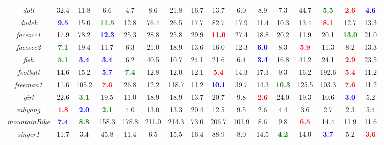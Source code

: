 \documentclass[preprint,12pt,review]{elsarticle}
\begin{document}
\begin{table*}[htp]
{\begin{tabular}{|c|c|c|c|c|c|c|c|c|c|c|c|c|c|c|c|}
\emph{doll}   &32.4   &11.8  &6.6 &4.7  &8.6 &21.8  &16.7  &13.7  &6.0  &8.9 &7.3 &44.7 &\textcolor{green}{\textbf{5.5}}  &\textcolor{red}{\textbf{2.6}}  &\textcolor{blue}{\textbf{4.6}}\\
\emph{dudek}   &\textcolor{blue}{\textbf{9.5}}  &15.0  &\textcolor{green}{\textbf{11.5}}  &12.8  &76.4 &26.5 &17.7 &82.7 &17.9 &11.4 &10.3 &13.4  &\textcolor{red}{\textbf{8.1}}  &12.7  &13.3 \\
\emph{faceocc1}   &17.9  &78.2  &\textcolor{blue}{\textbf{12.3}} &25.3  &28.8  &25.8  &29.9  &\textcolor{red}{\textbf{11.0}} &27.4 &18.8  &20.2  &11.9  &20.1 &\textcolor{green}{\textbf{13.0}} &21.0\\
\emph{faceocc2}  &\textcolor{green}{\textbf{7.1}}  &19.4  &11.7 &6.3  &21.0   &18.9  &13.6  &16.0  &12.3  &\textcolor{blue}{\textbf{6.0}} &8.3 &\textcolor{red}{\textbf{5.9}}  &11.3  &8.2 &13.3\\
\emph{fish}   &\textcolor{green}{\textbf{5.1}}  &\textcolor{blue}{\textbf{3.4}}  &\textcolor{blue}{\textbf{3.4}}   &6.2  &40.5 &10.7  &24.1  &21.6  &6.4  &\textcolor{blue}{\textbf{3.4}}  &16.8 &41.2 &24.1 &\textcolor{red}{\textbf{2.9}}  &23.5\\
\emph{football}   &14.6  &15.2  &\textcolor{blue}{\textbf{5.7}} &\textcolor{green}{\textbf{7.4}}  &12.8  &12.0  &12.1  &\textcolor{red}{\textbf{5.4}}  &14.3  &17.3  &9.3  &16.2  &192.6  &\textcolor{red}{\textbf{5.4}}  &11.2\\
\emph{freeman1}   &11.6  &105.2  &\textcolor{red}{\textbf{7.6}}  &26.8  &12.2 &118.7  &11.2 &\textcolor{blue}{\textbf{10.1}} &39.7 &14.3 &\textcolor{green}{\textbf{10.3}}  &125.5  &103.3  &\textcolor{red}{\textbf{7.6}} &11.2\\
\emph{girl}   &22.6  &\textcolor{green}{\textbf{3.1}}  &19.5  &11.0  &18.9  &18.9 &13.7 &20.7  &9.8  &\textcolor{red}{\textbf{2.6}}   &24.0  &19.3  &10.6  &\textcolor{blue}{\textbf{3.0}} &5.2\\
\emph{mhyang}   &\textcolor{red}{\textbf{1.8}}  &\textcolor{blue}{\textbf{2.0}}  &\textcolor{green}{\textbf{2.1}} &4.0 &13.0 &13.3  &20.4 &12.5 &9.5 &2.6 &4.4 &3.6 &2.7 &2.3 &5.4\\
\emph{mountainBike}   &\textcolor{blue}{\textbf{7.4}}  &\textcolor{green}{\textbf{8.8}}  &158.3  &178.8 &211.0 &214.3  &73.0  &206.7  &101.9 &8.6  &9.8  &\textcolor{red}{\textbf{6.5}}  &14.4  &11.9 &11.6\\
\emph{singer1}   &11.7  &3.4  &45.8 &11.4  &6.5  &15.5 &16.4 &88.9 &8.0 &14.5 &\textcolor{green}{\textbf{4.2}}  &14.0 &\textcolor{blue}{\textbf{3.7}} &5.2  &\textcolor{red}{\textbf{3.6}} \\

\end{tabular}}
\end{table*}
\end{document}
